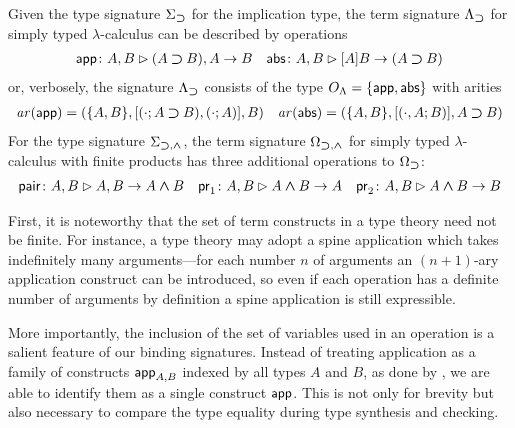 \begin{example} \label{ex:STLC-sig}
  Given the type signature $\Sigma_{\mathbin{\bm{\supset}}}$ for the implication type, the term signature $\Lambda_{\mathbin{\bm{\supset}}}$ for simply typed $\lambda$-calculus can be described by operations
  \begin{align*}
    \mathsf{app}\colon A, B \rhd (A \mathbin{\bm{\supset}} B), A \to B && \mathsf{abs}\colon A , B \rhd [A]B \to (A \mathbin{\bm{\supset}} B)
  \end{align*}
    or, verbosely, the signature $\Lambda_{\mathbin{\bm{\supset}}}$ consists of the type $O_\Lambda = \{\mathsf{app}, \mathsf{abs}\}$ with arities
  \begin{align*}
    \mathit{ar}(\mathsf{app}) = (\{A, B\}, [(\cdot; A \mathbin{\bm{\supset}} B), (\cdot; A)], B)
    && 
    \mathit{ar}(\mathsf{abs}) = (\{A, B\}, [(\cdot, A; B)], A \mathbin{\bm{\supset}} B)
  \end{align*}
  For the type signature $\Sigma_{\mathbin{\bm{\supset}}, \mathbin{\bm{\wedge}}}$, the term signature $\Omega_{\mathbin{\bm{\supset}}, \mathbin{\bm{\wedge}}}$ for simply typed $\lambda$-calculus with finite products has three additional operations
to $\Omega_{\mathbin{\bm{\supset}}}$:
  \begin{align*}
    \mathsf{pair}\colon A, B \rhd A, B \to A \mathbin{\bm{\wedge}} B
    && \mathsf{pr}_{1} \colon A, B \rhd A \mathbin{\bm{\wedge}} B \to A
    && \mathsf{pr}_{2} \colon A, B \rhd A \mathbin{\bm{\wedge}} B \to B
  \end{align*}
\end{example}

First, it is noteworthy that the set of term constructs in a type theory need not be finite.
For instance, a type theory may adopt a spine application which takes indefinitely many arguments---for each number $n$ of arguments an $(n+1)$-ary application construct can be introduced, so even if each operation has a definite number of arguments by definition a spine application is still expressible.

More importantly, the inclusion of the set of variables used in an operation is a salient feature of our binding signatures.
Instead of treating application as a family of constructs $\mathsf{app}_{A, B}$ indexed by all types $A$ and $B$, as done by \citet{Fiore2022}, we are able to identify them as a single construct $\mathsf{app}$.
This is not only for brevity but also necessary to compare the type equality during type synthesis and checking.

